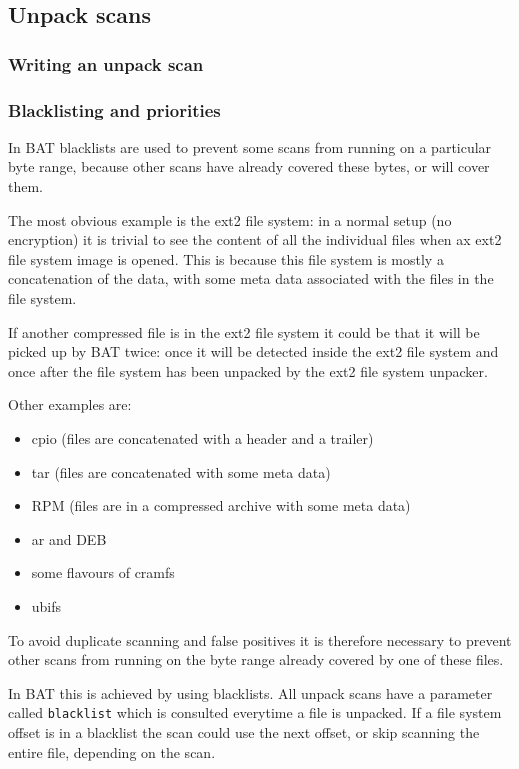 \documentclass[10pt]{article}
\begin{document}
\subsection{Unpack scans}

\subsubsection{Writing an unpack scan}

\subsubsection{Blacklisting and priorities}

In BAT blacklists are used to prevent some scans from running on a particular
byte range, because other scans have already covered these bytes, or will cover
them.

The most obvious example is the ext2 file system: in a normal setup (no
encryption) it is trivial to see the content of all the individual files when
ax ext2 file system image is opened. This is because this file system is
mostly a concatenation of the data, with some meta data associated with the
files in the file system.

If another compressed file is in the ext2 file system it could be that it will
be picked up by BAT twice: once it will be detected inside the ext2 file system
and once after the file system has been unpacked by the ext2 file system
unpacker.

Other examples are:

\begin{itemize}
\item cpio (files are concatenated with a header and a trailer)
\item tar (files are concatenated with some meta data)
\item RPM (files are in a compressed archive with some meta data)
\item ar and DEB
\item some flavours of cramfs
\item ubifs
\end{itemize}

To avoid duplicate scanning and false positives it is therefore necessary to
prevent other scans from running on the byte range already covered by one of
these files.

In BAT this is achieved by using blacklists. All unpack scans have a parameter
called \texttt{blacklist} which is consulted everytime a file is unpacked. If
a file system offset is in a blacklist the scan could use the next offset, or
skip scanning the entire file, depending on the scan.
\end{document}

